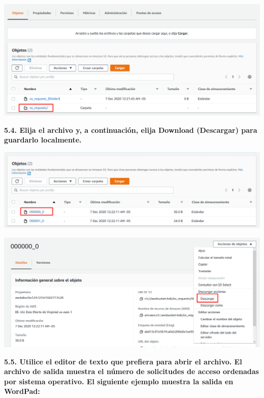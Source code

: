 \documentclass{article}
\begin{document}
    \begin{center}
		\includegraphics[width=15cm]{./images/29} 
	\end{center}

\textbf{5.4. Elija el archivo y, a continuación, elija Download (Descargar) para guardarlo localmente. 
}

    \begin{center}
		\includegraphics[width=15cm]{./images/30} 
	\end{center}

\begin{center}
		\includegraphics[width=15cm]{./images/31} 
	\end{center}
\textbf{5.5. Utilice el editor de texto que prefiera para abrir el archivo. El archivo de salida muestra el número
de solicitudes de acceso ordenadas por sistema operativo. El siguiente ejemplo muestra la salida en
WordPad:
}
\end{document}
